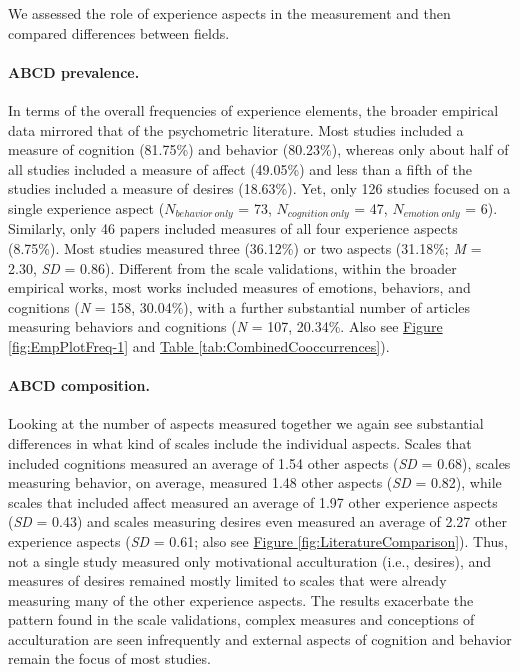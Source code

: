 \documentclass[man, 12pt, a4paper, mask]{apa7}
\newcommand{\fgrref}[2][]{\hyperref[#2]{Figure \ref*{#2}#1}}
\newcommand{\tblref}[2][]{\hyperref[#2]{Table \ref*{#2}#1}}
\begin{document}
We assessed the role of experience aspects in the measurement and then
compared differences between fields.

\paragraph{ABCD prevalence.}

In terms of the overall frequencies of experience elements, the broader
empirical data mirrored that of the psychometric literature. Most
studies included a measure of cognition (81.75\%) and behavior
(80.23\%), whereas only about half of all studies included a measure of
affect (49.05\%) and less than a fifth of the studies included a measure
of desires (18.63\%). Yet, only 126 studies focused on a single
experience aspect (\(N_{behavior\ only}\) = 73, \(N_{cognition\ only}\)
= 47, \(N_{emotion\ only}\) = 6). Similarly, only 46 papers included
measures of all four experience aspects (8.75\%). Most studies measured
three (36.12\%) or two aspects (31.18\%; \textit{M} = 2.30, \textit{SD}
= 0.86). Different from the scale validations, within the broader
empirical works, most works included measures of emotions, behaviors,
and cognitions (\textit{N} = 158, 30.04\%), with a further substantial
number of articles measuring behaviors and cognitions (\textit{N} = 107,
20.34\%. Also see \fgrref{fig:EmpPlotFreq-1} and
\tblref{tab:CombinedCooccurrences}).

\paragraph{ABCD composition.}

Looking at the number of aspects measured together we again see
substantial differences in what kind of scales include the individual
aspects. Scales that included cognitions measured an average of 1.54
other aspects (\textit{SD} = 0.68), scales measuring behavior, on
average, measured 1.48 other aspects (\textit{SD} = 0.82), while scales
that included affect measured an average of 1.97 other experience
aspects (\textit{SD} = 0.43) and scales measuring desires even measured
an average of 2.27 other experience aspects (\textit{SD} = 0.61; also
see \fgrref{fig:LiteratureComparison}). Thus, not a single study
measured only motivational acculturation (i.e., desires), and measures
of desires remained mostly limited to scales that were already measuring
many of the other experience aspects. The results exacerbate the pattern
found in the scale validations, complex measures and conceptions of
acculturation are seen infrequently and external aspects of cognition
and behavior remain the focus of most studies.
\end{document}
